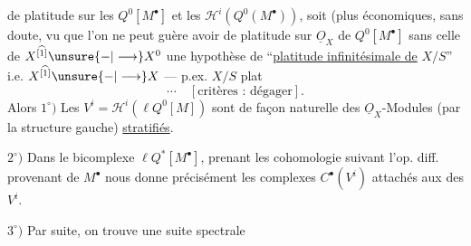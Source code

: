 de  platitude sur les $Q^0[M^\bullet]$ et les $\mathcal H^i(Q^0(M^\bullet))$,  soit (plus économiques, sans doute, vu que l'on ne peut guère avoir de platitude sur $\underline O_X$ de $Q^0[M^\bullet]$ sans celle de $X^{\widehat{[1]}}\unsure{-|\longrightarrow}X^0$\unsure{]|)} une hypothèse de ``\uline{platitude infinitésimale de} $X/S$'' i.e.  $X^{\widehat{[1]}}\unsure{-|\longrightarrow}X$ --- p.ex. $X/S$ plat
\[
\cdots\quad[\text{critères : dégager}].
\]
Alors
 $1^\circ)$ Les $V^i=\mathcal H^i(\ell Q^0[M])$ sont de façon naturelle des $\underline O_X$-Modules (par la structure gauche) \uline{stratifiés}.

$2^\circ)$ Dans le bicomplexe $\ell Q^*[M^\bullet]$, prenant les  cohomologie suivant l'op. diff. provenant de $M^\bullet$ nous donne précisément les  complexes $C^\bullet(V^i)$ attachés aux  des $V^i$.

$3^\circ)$ Par suite, on trouve une suite spectrale
